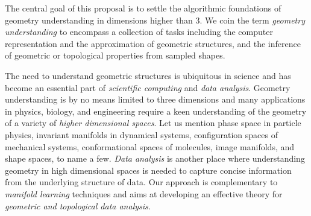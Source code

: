 The central goal of this proposal is to settle the algorithmic
foundations of geometry understanding in dimensions higher than 3.  We
coin the term {\em geometry understanding} to encompass a collection
of tasks including the computer representation and the approximation
of geometric structures, and the inference of geometric or topological
properties from sampled
shapes.  %

The need to understand geometric structures is ubiquitous in science
and has become an essential part of {\em scientific computing} and
{\em data analysis}. %
Geometry understanding is by no means limited to
three dimensions and many applications in physics, biology, and
engineering require a keen understanding of the geometry of a variety
of {\em higher dimensional spaces}. Let us mention phase space in particle
physics, invariant manifolds in dynamical systems, configuration
spaces of mechanical systems, conformational spaces of molecules,
image manifolds, and shape spaces, to name a few.  {\em Data
  analysis} is another place where understanding
geometry in high dimensional spaces is  needed to
 capture concise information from the underlying structure of
 data. Our approach is complementary to {\em manifold learning}
 techniques and aims at  developing an effective theory for {\em geometric and
 topological data analysis.}

